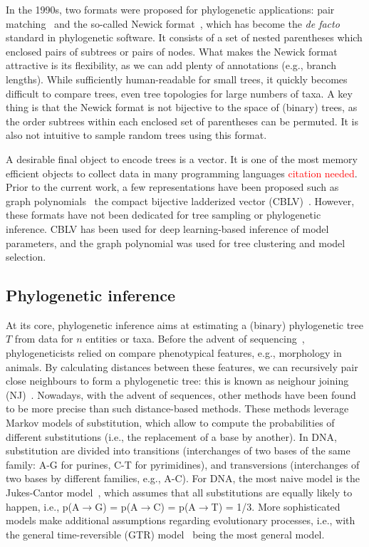 In the 1990s, two formats were proposed for phylogenetic applications: pair matching~\cite{diaconis1998} and the so-called Newick format~\cite{olsen1990, felsenstein2004}, which has become the \textit{de facto} standard in phylogenetic software. It consists of a set of nested parentheses which enclosed pairs of subtrees or pairs of nodes. What makes the Newick format attractive is its flexibility, as we can add plenty of annotations (e.g., branch lengths). While sufficiently human-readable for small trees, it quickly becomes difficult to compare trees, even tree topologies for large numbers of taxa. A key thing is that the Newick format is not bijective to the space of (binary) trees, as the order subtrees within each enclosed set of parentheses can be permuted. It is also not intuitive to sample random trees using this format. 

A desirable final object to encode trees is a vector. It is one of the most memory efficient objects to collect data in many programming languages \textcolor{red}{citation needed}. Prior to the current work, a few representations have been proposed such as graph polynomials~\cite{liu2021, liu2022} the compact bijective ladderized vector (CBLV)~\cite{voznica2022}. However, these formats have not been dedicated for tree sampling or phylogenetic inference. CBLV has been used for deep learning-based inference of model parameters, and the graph polynomial was used for tree clustering and model selection.

\subsection{Phylogenetic inference}
\label{sec:bkg_phylo_inference}

At its core, phylogenetic inference aims at estimating a (binary) phylogenetic tree $T$ from data for $n$ entities or taxa. Before the advent of sequencing~\cite{sanger1977}, phylogeneticists relied on compare phenotypical features, e.g., morphology in animals. By calculating distances between these features, we can recursively pair close neighbours to form a phylogenetic tree: this is known as neighour joining (NJ)~\cite{saitou1987}. Nowadays, with the advent of sequences, other methods have been found to be more precise than such distance-based methods. These methods leverage Markov models of substitution, which allow to compute the probabilities of different substitutions (i.e., the replacement of a base by another). In DNA, substitution are divided into transitions (interchanges of two bases of the same family: A-G for purines, C-T for pyrimidines), and transversions (interchanges of two bases by different families, e.g., A-C). For DNA, the most naive model is the Jukes-Cantor model~\cite{jukes1969}, which assumes that all substitutions are equally likely to happen, i.e., p(A$\rightarrow$G) = p(A$\rightarrow$C) = p(A$\rightarrow$T) = 1/3. More sophisticated models make additional assumptions regarding evolutionary processes, i.e., with the general time-reversible (GTR) model~\cite{tavare1986} being the most general model.

